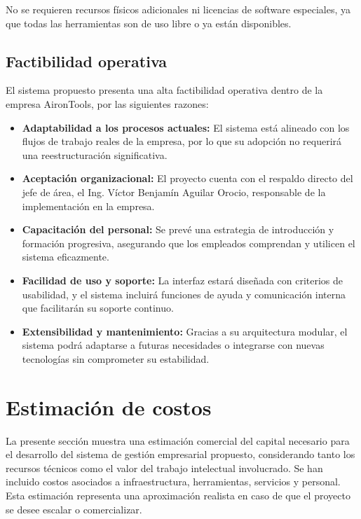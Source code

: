 No se requieren recursos físicos adicionales ni licencias de software especiales, ya que todas las herramientas son de uso libre o ya están disponibles.

\subsection{Factibilidad operativa}

El sistema propuesto presenta una alta factibilidad operativa dentro de la empresa AironTools, por las siguientes razones:

\begin{itemize}
	\item \textbf{Adaptabilidad a los procesos actuales:} El sistema está alineado con los flujos de trabajo reales de la empresa, por lo que su adopción no requerirá una reestructuración significativa.
	
	\item \textbf{Aceptación organizacional:} El proyecto cuenta con el respaldo directo del jefe de área, el Ing. Víctor Benjamín Aguilar Orocio, responsable de la implementación en la empresa.
	
	\item \textbf{Capacitación del personal:} Se prevé una estrategia de introducción y formación progresiva, asegurando que los empleados comprendan y utilicen el sistema eficazmente.
	
	\item \textbf{Facilidad de uso y soporte:} La interfaz estará diseñada con criterios de usabilidad, y el sistema incluirá funciones de ayuda y comunicación interna que facilitarán su soporte continuo.
	
	\item \textbf{Extensibilidad y mantenimiento:} Gracias a su arquitectura modular, el sistema podrá adaptarse a futuras necesidades o integrarse con nuevas tecnologías sin comprometer su estabilidad.
\end{itemize}

\vspace{0.5cm}
\section{Estimación de costos}

La presente sección muestra una estimación comercial del capital necesario para el desarrollo del sistema de gestión empresarial propuesto, considerando tanto los recursos técnicos como el valor del trabajo intelectual involucrado. Se han incluido costos asociados a infraestructura, herramientas, servicios y personal. Esta estimación representa una aproximación realista en caso de que el proyecto se desee escalar o comercializar.

